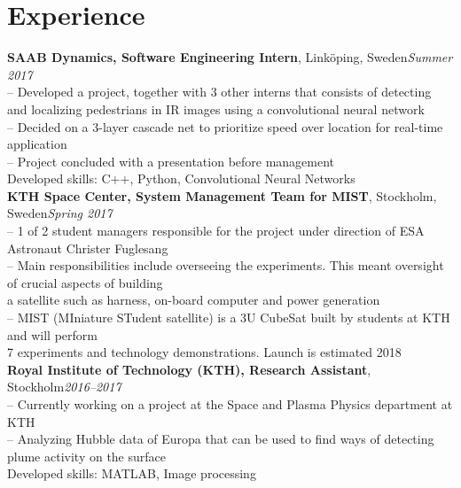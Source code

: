 \documentclass[10pt]{article}
\begin{document}
\section*{Experience}
\vspace{0.2em}
\hline
\vspace{0.5em}

\noindent\textbf{SAAB Dynamics, Software Engineering Intern}, Linköping, Sweden\hfill\textit{Summer 2017}\\
\indent-- Developed a project, together with 3 other interns that consists of detecting and localizing pedestrians in IR images using a convolutional neural network\\
\indent-- Decided on a 3-layer cascade net to prioritize speed over location for real-time application\\
\indent-- Project concluded with a presentation before management\\
\indent Developed skills: C++, Python, Convolutional Neural Networks\\

\noindent\textbf{KTH Space Center, System Management Team for MIST}, Stockholm, Sweden\hfill\textit{Spring 2017}\\
\indent-- 1 of 2 student managers responsible for the project under direction of ESA Astronaut Christer Fuglesang\\
\indent-- Main responsibilities include overseeing the experiments. This meant oversight of crucial aspects of building \\\indent\hspace{0.2cm}a satellite such as harness, on-board computer and power generation\\
\indent-- MIST (MIniature STudent satellite) is a 3U CubeSat built by students at KTH and will perform\\\indent\hspace{0.2cm} 7 experiments and technology demonstrations. Launch is estimated 2018\\

\noindent\textbf{Royal Institute of Technology (KTH), Research Assistant}, Stockholm\hfill\textit{2016--2017}\\
\indent-- Currently working on a project at the Space and Plasma Physics department at KTH\\
\indent-- Analyzing Hubble data of Europa that can be used to find ways of detecting plume activity on the surface\\
\indent Developed skills: MATLAB, Image processing\\
\end{document}
